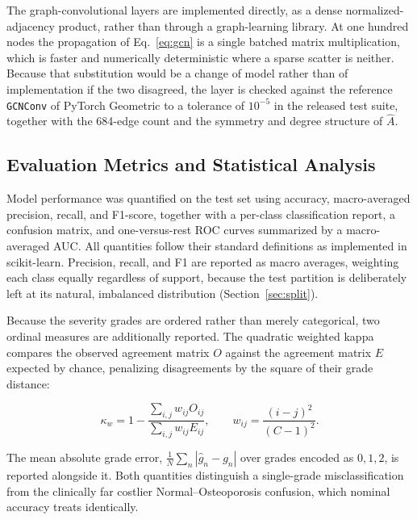 \documentclass[journal]{IEEEtran}
\begin{document}
The graph-convolutional layers are implemented directly, as a dense
normalized-adjacency product, rather than through a graph-learning library. At
one hundred nodes the propagation of Eq.~\eqref{eq:gcn} is a single batched
matrix multiplication, which is faster and numerically deterministic where a
sparse scatter is neither. Because that substitution would be a change of model
rather than of implementation if the two disagreed, the layer is checked against
the reference \texttt{GCNConv} of PyTorch Geometric to a tolerance of
$10^{-5}$ in the released test suite, together with the 684-edge count and the
symmetry and degree structure of $\hat{A}$.

\subsection{Evaluation Metrics and Statistical Analysis}
\label{sec:metrics}
Model performance was quantified on the test set using accuracy, macro-averaged
precision, recall, and F1-score, together with a per-class classification
report, a confusion matrix, and one-versus-rest ROC curves summarized by a
macro-averaged AUC. All quantities follow their standard definitions as
implemented in scikit-learn. Precision, recall, and F1 are reported as macro
averages, weighting each class equally regardless of support, because the test
partition is deliberately left at its natural, imbalanced distribution
(Section~\ref{sec:split}).

Because the severity grades are ordered rather than merely categorical, two
ordinal measures are additionally reported. The quadratic weighted kappa
compares the observed agreement matrix $O$ against the agreement matrix $E$
expected by chance, penalizing disagreements by the square of their grade
distance:

\begingroup
\small
\begin{equation}
\label{eq:qwk}
\kappa_{w} = 1 - \frac{\sum_{i,j} w_{ij}O_{ij}}{\sum_{i,j} w_{ij}E_{ij}},
\qquad w_{ij} = \frac{(i-j)^{2}}{(C-1)^{2}} .
\end{equation}
\endgroup

The mean absolute grade error, $\frac{1}{N}\sum_{n}|\hat{g}_n - g_n|$ over
grades encoded as $0,1,2$, is reported alongside it. Both quantities distinguish
a single-grade misclassification from the clinically far costlier
Normal--Osteoporosis confusion, which nominal accuracy treats identically.
\end{document}

